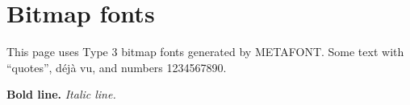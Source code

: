 \documentclass{article}\usepackage[T1]{fontenc}
\begin{document}
\section*{Bitmap fonts}
This page uses Type 3 bitmap fonts generated by METAFONT. Some text with ``quotes'', d\'ej\`a vu, and numbers 1234567890.

\textbf{Bold line.} \textit{Italic line.}
\end{document}
